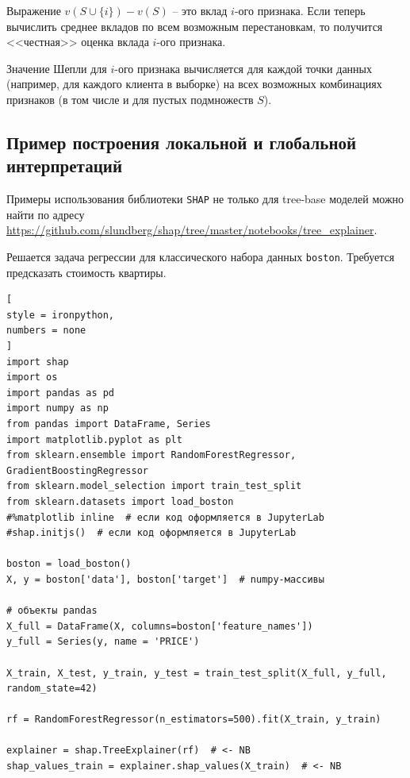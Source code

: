 \documentclass[%
	11pt,
	a4paper,
	utf8,
		]{article}
\begin{document}
Выражение $ v(S \cup \{i\}) - v(S) $ -- это вклад $ i $-ого признака. Если теперь вычислить среднее вкладов по всем возможным перестановкам, то получится <<честная>> оценка вклада $ i $-ого признака.

Значение Шепли для $ i $-ого признака вычисляется для каждой точки данных (например, для каждого клиента в выборке) на всех возможных комбинациях признаков (в том числе и для пустых подмножеств $ S $).




\subsection{ Пример построения локальной и глобальной интерпретаций }

Примеры использования библиотеки \texttt{SHAP} не только для tree-base моделей можно найти по адресу \url{https://github.com/slundberg/shap/tree/master/notebooks/tree_explainer}.

Решается задача регрессии для классического набора данных \texttt{boston}. Требуется предсказать стоимость квартиры. 

\begin{lstlisting}[
style = ironpython,
numbers = none
]
import shap
import os
import pandas as pd
import numpy as np
from pandas import DataFrame, Series
import matplotlib.pyplot as plt
from sklearn.ensemble import RandomForestRegressor, GradientBoostingRegressor
from sklearn.model_selection import train_test_split
from sklearn.datasets import load_boston
#%matplotlib inline  # если код оформляется в JupyterLab
#shap.initjs()  # если код оформляется в JupyterLab

boston = load_boston()
X, y = boston['data'], boston['target']  # numpy-массивы

# объекты pandas
X_full = DataFrame(X, columns=boston['feature_names'])
y_full = Series(y, name = 'PRICE')

X_train, X_test, y_train, y_test = train_test_split(X_full, y_full, random_state=42)

rf = RandomForestRegressor(n_estimators=500).fit(X_train, y_train)

explainer = shap.TreeExplainer(rf)  # <- NB
shap_values_train = explainer.shap_values(X_train)  # <- NB
\end{lstlisting}
\end{document}
